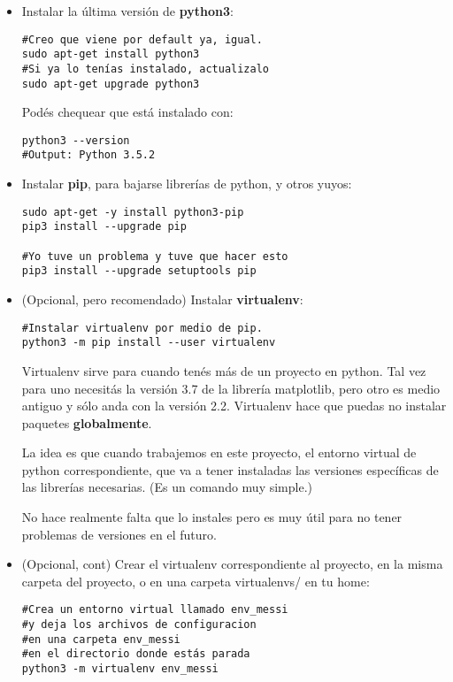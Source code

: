\documentclass[10pt,a4paper]{report}
\begin{document}
\begin{itemize}
\item Instalar la última versión de \textbf{python3}:

\begin{lstlisting}
#Creo que viene por default ya, igual.
sudo apt-get install python3
#Si ya lo tenías instalado, actualizalo
sudo apt-get upgrade python3
\end{lstlisting}

Podés chequear que está instalado con:

\begin{lstlisting}
python3 --version
#Output: Python 3.5.2
\end{lstlisting}

\item Instalar \textbf{pip}, para bajarse librerías de python, y otros yuyos:

\begin{lstlisting}
sudo apt-get -y install python3-pip
pip3 install --upgrade pip

#Yo tuve un problema y tuve que hacer esto
pip3 install --upgrade setuptools pip
\end{lstlisting}

\item (Opcional, pero recomendado) Instalar \textbf{virtualenv}:

\begin{lstlisting}
#Instalar virtualenv por medio de pip.
python3 -m pip install --user virtualenv
\end{lstlisting}

Virtualenv sirve para cuando tenés más de un proyecto en python. Tal vez para uno necesitás la versión 3.7 de la librería matplotlib, pero otro es medio antiguo y sólo anda con la versión 2.2. Virtualenv hace que puedas no instalar paquetes \textbf{globalmente}.

La idea es que cuando trabajemos en este proyecto,  el entorno virtual de python correspondiente, que va a tener instaladas las versiones específicas de las librerías necesarias. (Es un comando muy simple.)

No hace realmente falta que lo instales pero es muy útil para no tener problemas de versiones en el futuro.

\item (Opcional, cont) Crear el virtualenv correspondiente al proyecto, en la misma carpeta del proyecto, o en una carpeta virtualenvs/ en tu home:

\begin{lstlisting}
#Crea un entorno virtual llamado env_messi
#y deja los archivos de configuracion
#en una carpeta env_messi
#en el directorio donde estás parada
python3 -m virtualenv env_messi
\end{lstlisting}


\end{itemize}
\end{document}

